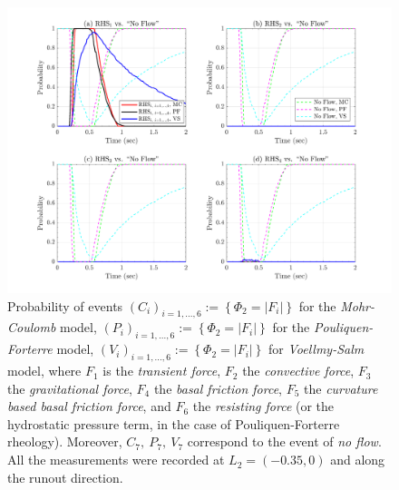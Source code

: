 \documentclass{article}
\begin{document}
\begin{figure}[H]
        \centering
        \includegraphics[width=1\textwidth]{InclinedPlane/Dominance1/DominancePrX_L2.png}
        \caption{Probability of events $(C_i)_{i=1,...,6}:=\left\{\Phi_2=|F_i|\right\}$ for the \emph{Mohr-Coulomb} model, $(P_i)_{i=1,...,6}:=\left\{\Phi_2=|F_i|\right\}$ for the \emph{Pouliquen-Forterre} model, $(V_i)_{i=1,...,6}:=\left\{\Phi_2=|F_i|\right\}$ for \emph{Voellmy-Salm} model, where $F_1$ is the \emph{transient force}, $F_2$ the \emph{convective force}, $F_3$ the \emph{gravitational force}, $F_4$ the \emph{basal friction force}, $F_5$ the \emph{curvature based basal friction force}, and $F_6$ the \emph{resisting force} (or the hydrostatic pressure term, in the case of Pouliquen-Forterre rheology). Moreover, $C_7,\ P_7,\ V_7$ correspond to the event of \emph{no flow}. All the measurements were recorded at $L_2=(-0.35,0)$ and along the runout direction.}
        \label{fig:Ramp-FXDominance1-L2}
\end{figure}
\end{document}
